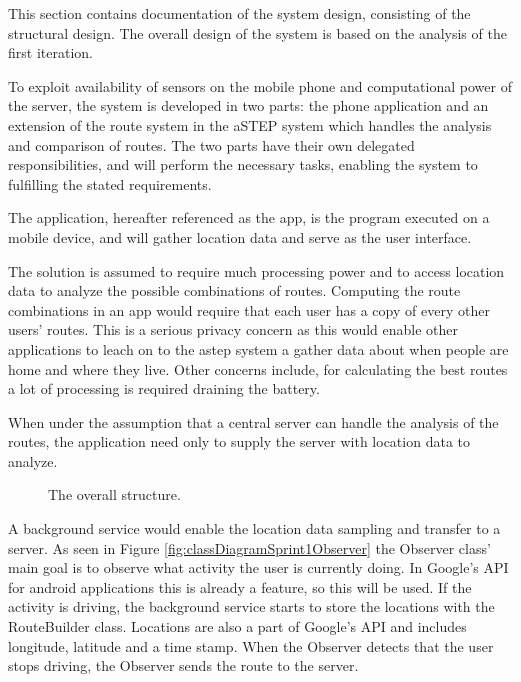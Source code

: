 This section contains documentation of the system design, consisting of the structural design.
The overall design of the system is based on the analysis of the first iteration.

To exploit availability of sensors on the mobile phone and computational power of the server, the system is developed in two parts: the phone application and an extension of the route system in the aSTEP system which handles the analysis and comparison of routes.
The two parts have their own delegated responsibilities, and will perform the necessary tasks, enabling the system to fulfilling the stated requirements.

The application, hereafter referenced as the app, is the program executed on a mobile device, and will gather location data and serve as the user interface. 

The solution is assumed to require much processing power and to access location data to analyze the possible combinations of routes.
Computing the route combinations in an app would require that each user has a copy of every other users' routes.
This is a serious privacy concern as this would enable other applications to leach on to the \gls{astep} system a gather data about when people are home and where they live.
Other concerns include, for calculating the best routes a lot of processing is required draining the battery.

When under the assumption that a central server can handle the analysis of the routes, the application need only to supply the server with location data to analyze.

\begin{figure}[h]
	\centering
	
	\caption{The overall structure.}
	\label{fig:packageDiagramSprint1}
\end{figure}

A background service would enable the location data sampling and transfer to a server.
As seen in Figure \ref{fig:classDiagramSprint1Observer} the Observer class' main goal is to observe what activity the user is currently doing.
In Google's API for android applications this is already a feature, so this will be used.
If the activity is driving, the background service starts to store the locations with the RouteBuilder class.
Locations are also a part of Google's API and includes longitude, latitude and a time stamp.
When the Observer detects that the user stops driving, the Observer sends the route to the server.

